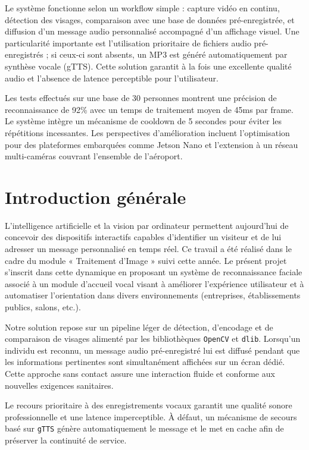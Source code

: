 \documentclass[12pt,a4paper]{article}
\begin{document}
Le système fonctionne selon un workflow simple : capture vidéo en continu, détection des visages, comparaison avec une base de données pré-enregistrée, et diffusion d'un message audio personnalisé accompagné d'un affichage visuel. Une particularité importante est l'utilisation prioritaire de fichiers audio pré-enregistrés ; si ceux-ci sont absents, un MP3 est généré automatiquement par synthèse vocale (gTTS). Cette solution garantit à la fois une excellente qualité audio et l'absence de latence perceptible pour l'utilisateur.

Les tests effectués sur une base de 30 personnes montrent une précision de reconnaissance de 92\% avec un temps de traitement moyen de 45ms par frame. Le système intègre un mécanisme de cooldown de 5 secondes pour éviter les répétitions incessantes. Les perspectives d'amélioration incluent l'optimisation pour des plateformes embarquées comme Jetson Nano et l'extension à un réseau multi-caméras couvrant l'ensemble de l'aéroport.

\newpage

\tableofcontents

\newpage

\section{Introduction générale}

L’intelligence artificielle et la vision par ordinateur permettent aujourd’hui de concevoir des dispositifs interactifs capables d’identifier un visiteur et de lui adresser un message personnalisé en temps réel. Ce travail a été réalisé dans le cadre du module « Traitement d’Image » suivi cette année. Le présent projet s’inscrit dans cette dynamique en proposant un système de reconnaissance faciale associé à un module d’accueil vocal visant à améliorer l’expérience utilisateur et à automatiser l’orientation dans divers environnements (entreprises, établissements publics, salons, etc.).

Notre solution repose sur un pipeline léger de détection, d’encodage et de comparaison de visages alimenté par les bibliothèques \texttt{OpenCV} et \texttt{dlib}. Lorsqu’un individu est reconnu, un message audio pré-enregistré lui est diffusé pendant que les informations pertinentes sont simultanément affichées sur un écran dédié. Cette approche sans contact assure une interaction fluide et conforme aux nouvelles exigences sanitaires.

Le recours prioritaire à des enregistrements vocaux garantit une qualité sonore professionnelle et une latence imperceptible. À défaut, un mécanisme de secours basé sur \texttt{gTTS} génère automatiquement le message et le met en cache afin de préserver la continuité de service.
\end{document}
